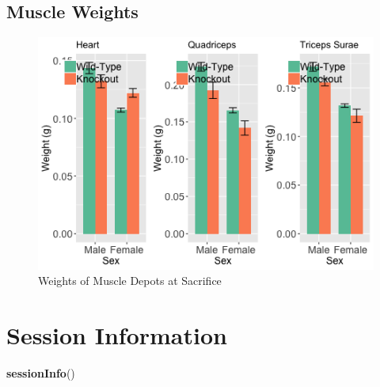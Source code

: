 \documentclass[]{article}
\newenvironment{Shaded}{\begin{snugshade}}{\end{snugshade}}
\newcommand{\KeywordTok}[1]{\textcolor[rgb]{0.13,0.29,0.53}{\textbf{#1}}}
\newcommand{\NormalTok}[1]{#1}
\begin{document}
\subsection{Muscle Weights}\label{muscle-weights}

\begin{figure}
\centering
\includegraphics{figures/muscle-weights-1.png}
\caption{Weights of Muscle Depots at Sacrifice}
\end{figure}

\section{Session Information}\label{session-information}

\begin{Shaded}
\begin{Highlighting}[]
\KeywordTok{sessionInfo}\NormalTok{()}
\end{Highlighting}
\end{Shaded}
\end{document}
